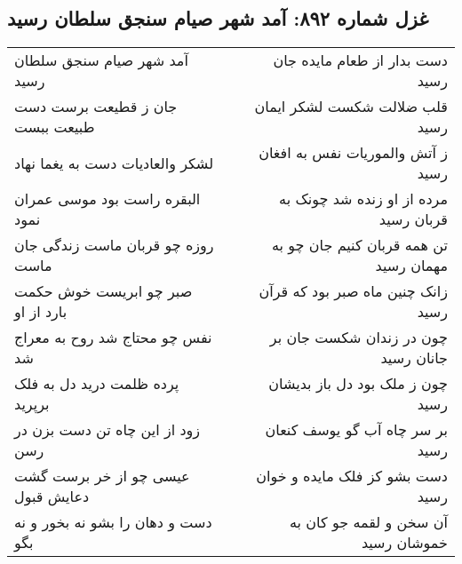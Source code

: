 \begin{center}
\section*{غزل شماره ۸۹۲: آمد شهر صیام سنجق سلطان رسید}
\label{sec:0892}
\begin{longtable}{l p{0.5cm} r}
آمد شهر صیام سنجق سلطان رسید
&&
دست بدار از طعام مایده جان رسید
\\
جان ز قطیعت برست دست طبیعت ببست
&&
قلب ضلالت شکست لشکر ایمان رسید
\\
لشکر والعادیات دست به یغما نهاد
&&
ز آتش والموریات نفس به افغان رسید
\\
البقره راست بود موسی عمران نمود
&&
مرده از او زنده شد چونک به قربان رسید
\\
روزه چو قربان ماست زندگی جان ماست
&&
تن همه قربان کنیم جان چو به مهمان رسید
\\
صبر چو ابریست خوش حکمت بارد از او
&&
زانک چنین ماه صبر بود که قرآن رسید
\\
نفس چو محتاج شد روح به معراج شد
&&
چون در زندان شکست جان بر جانان رسید
\\
پرده ظلمت درید دل به فلک برپرید
&&
چون ز ملک بود دل باز بدیشان رسید
\\
زود از این چاه تن دست بزن در رسن
&&
بر سر چاه آب گو یوسف کنعان رسید
\\
عیسی چو از خر برست گشت دعایش قبول
&&
دست بشو کز فلک مایده و خوان رسید
\\
دست و دهان را بشو نه بخور و نه بگو
&&
آن سخن و لقمه جو کان به خموشان رسید
\\
\end{longtable}
\end{center}
